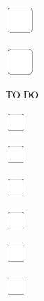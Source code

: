 \documentclass[11pt,titlepage]{article}
\begin{document}
\noindent
\includegraphics[]{checkbox-6mm.pdf}

\vspace{12mm}

\noindent
\includegraphics[]{checkbox-6mm.pdf}

\pagebreak

\small %
\hfill TO DO

\vspace{6mm}

\noindent
\includegraphics[]{checkbox-4mm.pdf}

\vspace{10mm}

\noindent
\includegraphics[]{checkbox-4mm.pdf}

\vspace{10mm}

\noindent
\includegraphics[]{checkbox-4mm.pdf}

\vspace{10mm}

\noindent
\includegraphics[]{checkbox-4mm.pdf}

\vspace{10mm}

\noindent
\includegraphics[]{checkbox-4mm.pdf}

\vspace{10mm}

\noindent
\includegraphics[]{checkbox-4mm.pdf}
\end{document}

